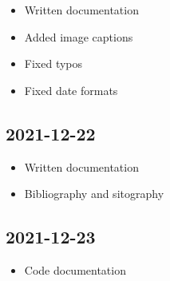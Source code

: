 \documentclass{article}
\begin{document}
\begin{itemize}
    \item Written documentation
    \item Added image captions
    \item Fixed typos
    \item Fixed date formats
\end{itemize}

\subsection*{2021-12-22}

\begin{itemize}
    \item Written documentation
    \item Bibliography and sitography
\end{itemize}

\subsection*{2021-12-23}

\begin{itemize}
    \item Code documentation
\end{itemize}
\end{document}
